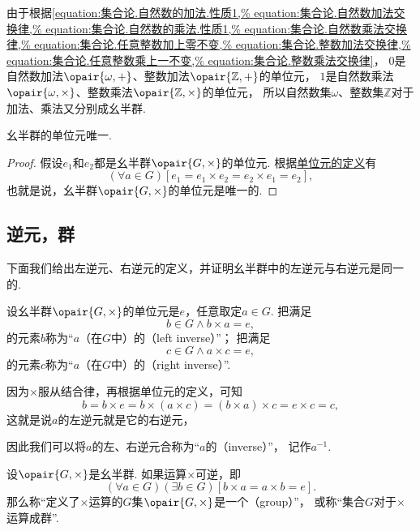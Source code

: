 由于根据\cref{equation:集合论.自然数的加法.性质1,%
equation:集合论.自然数加法交换律,%
equation:集合论.自然数的乘法.性质1,%
equation:集合论.自然数乘法交换律,%
equation:集合论.任意整数加上零不变,%
equation:集合论.整数加法交换律,%
equation:集合论.任意整数乘上一不变,%
equation:集合论.整数乘法交换律}，
\(0\)是自然数加法\(\opair{\omega,+}\)、整数加法\(\opair{\mathbb{Z},+}\)的单位元，
\(1\)是自然数乘法\(\opair{\omega,\times}\)、整数乘法\(\opair{\mathbb{Z},\times}\)的单位元，
所以自然数集\(\omega\)、整数集\(\mathbb{Z}\)对于加法、乘法又分别成幺半群.

\begin{theorem}\label{theorem:抽象代数.群内单位元唯一}
幺半群的单位元唯一.
\begin{proof}
假设\(e_1\)和\(e_2\)都是幺半群\(\opair{G,\times}\)的单位元.
根据\hyperref[definition:抽象代数.幺半群的定义]{单位元的定义}有\[
	(\forall a \in G)[
		e_1 = e_1 \times e_2 = e_2 \times e_1 = e_2
	],
\]
也就是说，幺半群\(\opair{G,\times}\)的单位元是唯一的.
\end{proof}
\end{theorem}

\subsection{逆元，群}
下面我们给出左逆元、右逆元的定义，并证明幺半群中的左逆元与右逆元是同一的.

设幺半群\(\opair{G,\times}\)的单位元是\(e\)，任意取定\(a \in G\).
把满足\[
	b \in G
	\land
	b \times a = e,
\]的元素\(b\)称为“\(a\)（在\(G\)中）的（left inverse）”；
把满足\[
	c \in G
	\land
	a \times c = e,
\]的元素\(c\)称为“\(a\)（在\(G\)中）的（right inverse）”.

因为\(\times\)服从结合律，再根据单位元的定义，可知\[
	b = b \times e = b \times (a \times c) = (b \times a) \times c = e \times c = c,
\]
这就是说\(a\)的左逆元就是它的右逆元，

因此我们可以将\(a\)的左、右逆元合称为“\(a\)的（inverse）”，
记作\(a^{-1}\).

\begin{definition}\label{definition:抽象代数.群的定义}
设\(\opair{G,\times}\)是幺半群.
如果运算\(\times\)可逆，即\[
	(\forall a \in G)(\exists b \in G)
	[b \times a = a \times b = e].
\]
那么称“定义了\(\times\)运算的\(G\)集\(\opair{G,\times}\)是一个（group）”，
或称“集合\(G\)对于\(\times\)运算成群”.
\end{definition}

